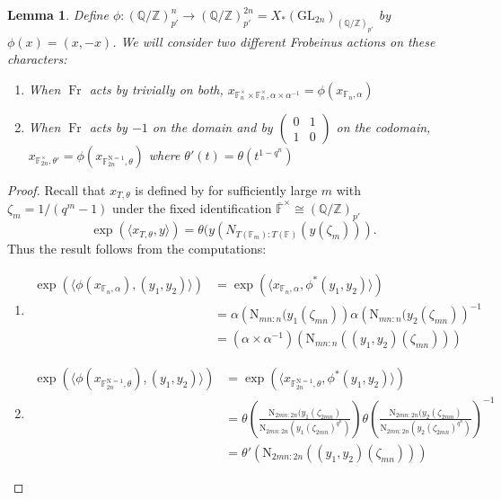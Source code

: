 \documentclass[12pt, reqno]{amsart}
\newtheorem{lemma}[theorem]{Lemma}
\theoremstyle{definition}
\theoremstyle{definition}
\theoremstyle{definition}
\newcommand{\multiplicativegroup}[1]{#1^{\times}}
\newcommand{\GL}{\mathrm{GL}}
\newcommand{\FieldNorm}[2]{\mathrm{N}_{#1:#2}}
\newcommand{\aFieldNorm}{\mathrm{N}}
\newcommand{\finiteField}{\mathbb{F}}
\newcommand{\finiteFieldExtension}[1]{\finiteField_{#1}}
\newcommand{\NormOneGroup}[1]{\finiteFieldExtension{#1}^{\aFieldNorm = 1}}
\newcommand{\algebraicClosure}[1]{\overline{#1}}
\newcommand{\Frobenius}{\operatorname{Fr}}
\begin{document}
\begin{lemma}
\label{lem:cochar_computation}
    Define $\phi:(\mathbb{Q}/\mathbb{Z})_{p'}^n \to (\mathbb{Q}/\mathbb{Z})_{p'}^{2n} = X_*(\GL_{2n})_{(\mathbb{Q}/\mathbb{Z})_{p'}}$ by $\phi(x) = (x,-x)$. We will consider two different Frobeinus actions on these characters:
    \begin{enumerate}
        \item When $\Frobenius$ acts by trivially on both, $x_{\finiteFieldExtension{n}^\times \times \finiteFieldExtension{n}^\times,\alpha \times \alpha^{-1}} = \phi(x_{\finiteFieldExtension{n},\alpha})$
        \item When $\Frobenius$ acts by $-1$ on the domain and by $\begin{pmatrix}
            0 & 1 \\
            1 & 0\end{pmatrix}$ on the codomain, $x_{\finiteField_{2n}^\times,\theta'}=\phi(x_{\NormOneGroup{2n},\theta})$ where $\theta'(t) = \theta(t^{1-q^n})$
    \end{enumerate}
\end{lemma}
\begin{proof}
Recall that $x_{T,\theta}$ is defined by for sufficiently large $m$ with $\zeta_m = 1/(q^m-1)$ under the fixed identification $\multiplicativegroup{\algebraicClosure{\finiteField}} \cong (\mathbb{Q}/\mathbb{Z})_{p'}$
\[
    \exp(\langle x_{T,\theta},y\rangle) = \theta(y(N_{T(\finiteField_m):T(\finiteField)}(y(\zeta_m))).
\]
Thus the result follows from the computations:
\begin{enumerate}
	\item \begin{align*}
		\exp(\langle\phi(x_{\finiteFieldExtension{n},\alpha}),(y_1,y_2)\rangle) &= \exp(\langle x_{\finiteFieldExtension{n},\alpha},\phi^*(y_1,y_2)\rangle) \\
		&= \alpha\left(\FieldNorm{mn}{n}(y_1(\zeta_{mn})\right) \alpha\left(\FieldNorm{mn}{n}(y_2(\zeta_{mn})\right)^{-1} \\
		&= \left(\alpha\times\alpha^{-1}\right)\left(\FieldNorm{mn}{n}((y_1,y_2)(\zeta_{mn}))\right)
	\end{align*}
	\item \begin{align*}
		\exp(\langle\phi(x_{\NormOneGroup{2n},\theta}),(y_1,y_2)\rangle) &= \exp(\langle x_{\NormOneGroup{2n},\theta},\phi^*(y_1,y_2)\rangle) \\
		&= \theta\left(\frac{\FieldNorm{2mn}{2n}(y_1(\zeta_{2mn})}{\FieldNorm{2mn}{2n}\left(y_1(\zeta_{2mn})^{q^n}\right)}\right) \theta\left(\frac{\FieldNorm{2mn}{2n}(y_2(\zeta_{2mn})}{\FieldNorm{2mn}{2n}\left(y_2(\zeta_{2mn})^{q^n}\right)}\right)^{-1} \\
		&= \theta'\left(\FieldNorm{2mn}{2n}((y_1,y_2)(\zeta_{mn}))\right)
	\end{align*}
\end{enumerate}
\end{proof}
\end{document}
